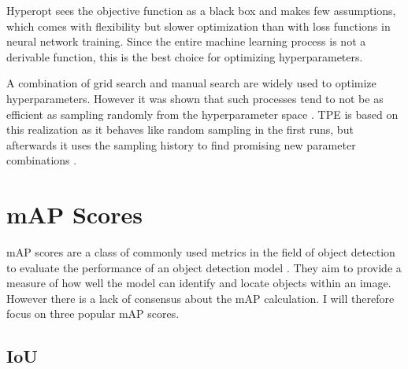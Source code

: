 \documentclass[10pt]{book}
\begin{document}
Hyperopt sees the objective function as a black box and makes few assumptions, which comes with flexibility but slower optimization than with loss functions in neural network training. Since the entire machine learning process is not a derivable function, this is the best choice for optimizing hyperparameters.

A combination of grid search and manual search are widely used to optimize hyperparameters. However it was shown that such processes tend to not be as efficient as sampling randomly from the hyperparameter space \cite{bergstra2012random}. \ac{TPE} is based on this realization as it behaves like random sampling in the first runs, but afterwards it uses the sampling history to find promising new parameter combinations \cite{bergstra2011algorithms}. 


\section{mAP Scores}

\ac{mAP} scores are a class of commonly used metrics in the field of object detection to evaluate the performance of an object detection model \cite{padilla2020survey}. They aim to provide a measure of how well the model can identify and locate objects within an image. However there is a lack of consensus about the \ac{mAP} calculation. I will therefore focus on three popular \ac{mAP} scores. 

\subsection{IoU}
\end{document}

